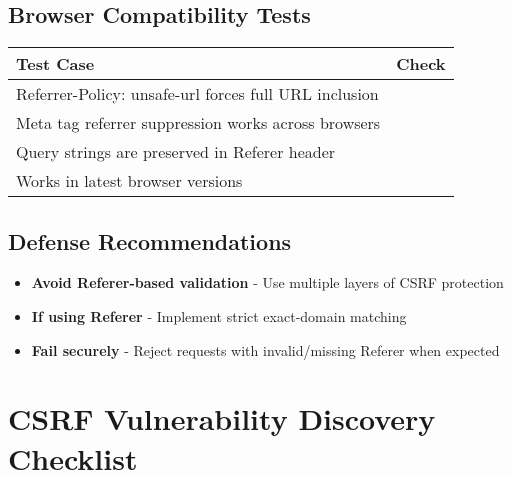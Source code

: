 \documentclass{article}
\begin{document}
\subsection*{Browser Compatibility Tests}
\begin{tabular}{>{\raggedright\arraybackslash}p{}c}
    \toprule
    \textbf{Test Case} & \textbf{Check} \\
    \midrule
    Referrer-Policy: unsafe-url forces full URL inclusion  \\
    Meta tag referrer suppression works across browsers \\
    Query strings are preserved in Referer header \\
    Works in latest browser versions \\
    \bottomrule
\end{tabular}

\subsection*{Defense Recommendations}
\begin{itemize}
    \item \textbf{Avoid Referer-based validation} - Use multiple layers of CSRF protection
    \item \textbf{If using Referer} - Implement strict exact-domain matching
    \item \textbf{Fail securely} - Reject requests with invalid/missing Referer when expected
\end{itemize}

\newpage


\section*{CSRF Vulnerability Discovery Checklist}
\end{document}
